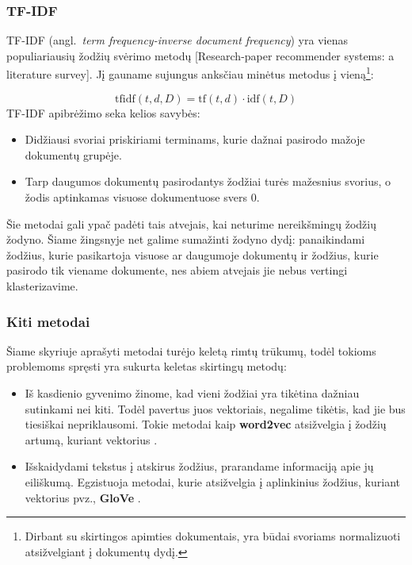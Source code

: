 \documentclass{VUMIFInfKursinis}
\newcommand{\ltang}[2]{#1 (angl.\  \textit{#2}) }
\begin{document}
\subsubsection{TF-IDF}

\ltang{TF-IDF}{term frequency-inverse document frequency} yra
vienas populiariausių žodžių svėrimo metodų {[}Research-paper
recommender systems: a literature survey{]}. Jį gauname sujungus
anksčiau minėtus metodus į vieną\footnote{Dirbant su skirtingos apimties
  dokumentais, yra būdai svoriams normalizuoti atsižvelgiant į dokumentų
  dydį.}:

  $${\displaystyle \mathrm {tfidf} (t,d,D)=\mathrm {tf} (t,d)\cdot \mathrm {idf} (t,D)}$$
TF-IDF apibrėžimo seka kelios savybės:

\begin{itemize}
\item
  Didžiausi svoriai priskiriami terminams, kurie dažnai pasirodo mažoje
  dokumentų grupėje.
\item
  Tarp daugumos dokumentų pasirodantys žodžiai turės mažesnius svorius,
  o žodis aptinkamas visuose dokumentuose svers 0.
\end{itemize}

Šie metodai gali ypač padėti tais atvejais, kai neturime nereikšmingų
žodžių žodyno. Šiame žingsnyje net galime sumažinti žodyno dydį:
panaikindami žodžius, kurie pasikartoja visuose ar daugumoje dokumentų
ir žodžius, kurie pasirodo tik viename dokumente, nes abiem atvejais jie
nebus vertingi klasterizavime.





\subsubsection{Kiti metodai}

Šiame skyriuje aprašyti metodai turėjo keletą rimtų trūkumų, todėl
tokioms problemoms spręsti yra sukurta keletas skirtingų metodų:

\begin{itemize}
\item
  Iš kasdienio gyvenimo žinome, kad vieni žodžiai yra tikėtina dažniau
  sutinkami nei kiti. Todėl pavertus juos vektoriais, negalime tikėtis,
  kad jie bus tiesiškai nepriklausomi. Tokie metodai kaip
  \textbf{word2vec} atsižvelgia į žodžių artumą, kuriant vektorius \cite{mikolov2013efficient}.
\item
  Išskaidydami tekstus į atskirus žodžius, prarandame informaciją apie
  jų eiliškumą. Egzistuoja metodai, kurie atsižvelgia į aplinkinius
  žodžius, kuriant vektorius pvz., \textbf{GloVe} \cite{pennington2014glove}.
\end{itemize}
\end{document}
